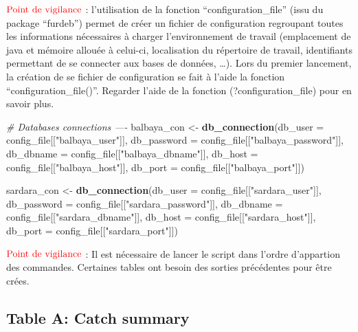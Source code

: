 \documentclass[]{article}
\newenvironment{Shaded}{\begin{snugshade}}{\end{snugshade}}
\newcommand{\CommentTok}[1]{\textcolor[rgb]{0.56,0.35,0.01}{\textit{#1}}}
\newcommand{\DataTypeTok}[1]{\textcolor[rgb]{0.13,0.29,0.53}{#1}}
\newcommand{\KeywordTok}[1]{\textcolor[rgb]{0.13,0.29,0.53}{\textbf{#1}}}
\newcommand{\NormalTok}[1]{#1}
\newcommand{\StringTok}[1]{\textcolor[rgb]{0.31,0.60,0.02}{#1}}
\begin{document}
\textbf{\(\color{red}{\text{Point de vigilance}}\)} : l'utilisation de
la fonction ``configuration\_file'' (issu du package ``furdeb'') permet
de créer un fichier de configuration regroupant toutes les informations
nécessaires à charger l'environnement de travail (emplacement de java et
mémoire allouée à celui-ci, localisation du répertoire de travail,
identifiants permettant de se connecter aux bases de données, \ldots{}).
Lors du premier lancement, la création de se fichier de configuration se
fait à l'aide la fonction ``configuration\_file()''. Regarder l'aide de
la fonction (?configuration\_file) pour en savoir plus.

\begin{Shaded}
\begin{Highlighting}[]
\CommentTok{# Databases connections ----}
\NormalTok{balbaya_con <-}\StringTok{ }\KeywordTok{db_connection}\NormalTok{(}\DataTypeTok{db_user =}\NormalTok{ config_file[[}\StringTok{"balbaya_user"}\NormalTok{]], }
    \DataTypeTok{db_password =}\NormalTok{ config_file[[}\StringTok{"balbaya_password"}\NormalTok{]], }
    \DataTypeTok{db_dbname =}\NormalTok{ config_file[[}\StringTok{"balbaya_dbname"}\NormalTok{]], }
    \DataTypeTok{db_host =}\NormalTok{ config_file[[}\StringTok{"balbaya_host"}\NormalTok{]], }
    \DataTypeTok{db_port =}\NormalTok{ config_file[[}\StringTok{"balbaya_port"}\NormalTok{]])}

\NormalTok{sardara_con <-}\StringTok{ }\KeywordTok{db_connection}\NormalTok{(}\DataTypeTok{db_user =}\NormalTok{ config_file[[}\StringTok{"sardara_user"}\NormalTok{]], }
    \DataTypeTok{db_password =}\NormalTok{ config_file[[}\StringTok{"sardara_password"}\NormalTok{]], }
    \DataTypeTok{db_dbname =}\NormalTok{ config_file[[}\StringTok{"sardara_dbname"}\NormalTok{]], }
    \DataTypeTok{db_host =}\NormalTok{ config_file[[}\StringTok{"sardara_host"}\NormalTok{]], }
    \DataTypeTok{db_port =}\NormalTok{ config_file[[}\StringTok{"sardara_port"}\NormalTok{]])}
\end{Highlighting}
\end{Shaded}

\textbf{\(\color{red}{\text{Point de vigilance}}\)} : Il est nécessaire
de lancer le script dans l'ordre d'appartion des commandes. Certaines
tables ont besoin des sorties précédentes pour être crées.

\hypertarget{table-a-catch-summary}{%
\subsection{Table A: Catch summary}\label{table-a-catch-summary}}
\end{document}
